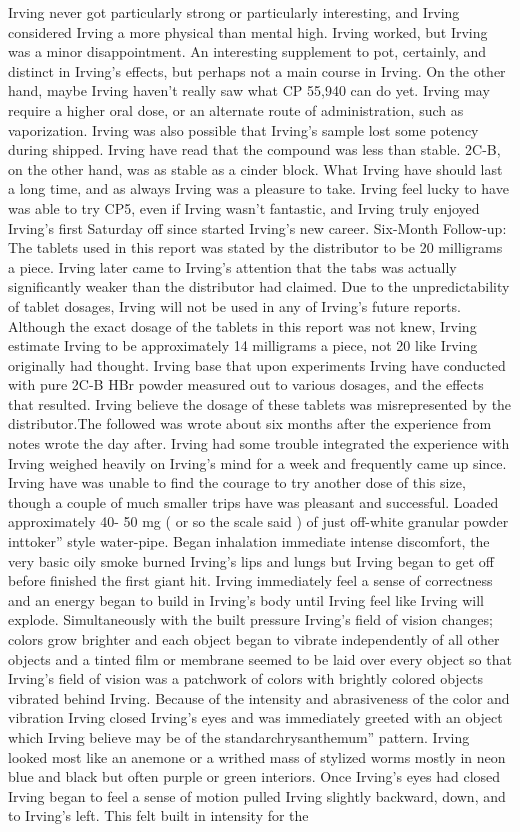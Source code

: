 \documentclass[12pt]{book}
\begin{document}
Irving never got particularly strong or particularly interesting, and Irving considered Irving a more physical than mental high. Irving worked, but Irving was a minor disappointment. An interesting supplement to pot, certainly, and distinct in Irving's effects, but perhaps not a main course in Irving. On the other hand, maybe Irving haven't really saw what CP 55,940 can do yet. Irving may require a higher oral dose, or an alternate route of administration, such as vaporization. Irving was also possible that Irving's sample lost some potency during shipped. Irving have read that the compound was less than stable. 2C-B, on the other hand, was as stable as a cinder block. What Irving have should last a long time, and as always Irving was a pleasure to take. Irving feel lucky to have was able to try CP5, even if Irving wasn't fantastic, and Irving truly enjoyed Irving's first Saturday off since started Irving's new career. Six-Month Follow-up: The tablets used in this report was stated by the distributor to be 20 milligrams a piece. Irving later came to Irving's attention that the tabs was actually significantly weaker than the distributor had claimed. Due to the unpredictability of tablet dosages, Irving will not be used in any of Irving's future reports. Although the exact dosage of the tablets in this report was not knew, Irving estimate Irving to be approximately 14 milligrams a piece, not 20 like Irving originally had thought. Irving base that upon experiments Irving have conducted with pure 2C-B HBr powder measured out to various dosages, and the effects that resulted. Irving believe the dosage of these tablets was misrepresented by the distributor.The followed was wrote about six months after the experience from notes wrote the day after. Irving had some trouble integrated the experience with Irving weighed heavily on Irving's mind for a week and frequently came up since. Irving have was unable to find the courage to try another dose of this size, though a couple of much smaller trips have was pleasant and successful. Loaded approximately 40- 50 mg ( or so the scale said ) of just off-white granular powder inttoker'' style water-pipe. Began inhalation immediate intense discomfort, the very basic oily smoke burned Irving's lips and lungs but Irving began to get off before finished the first giant hit. Irving immediately feel a sense of correctness and an energy began to build in Irving's body until Irving feel like Irving will explode. Simultaneously with the built pressure Irving's field of vision changes; colors grow brighter and each object began to vibrate independently of all other objects and a tinted film or membrane seemed to be laid over every object so that Irving's field of vision was a patchwork of colors with brightly colored objects vibrated behind Irving. Because of the intensity and abrasiveness of the color and vibration Irving closed Irving's eyes and was immediately greeted with an object which Irving believe may be of the standarchrysanthemum'' pattern. Irving looked most like an anemone or a writhed mass of stylized worms mostly in neon blue and black but often purple or green interiors. Once Irving's eyes had closed Irving began to feel a sense of motion pulled Irving slightly backward, down, and to Irving's left. This felt built in intensity for the 
\end{document}
